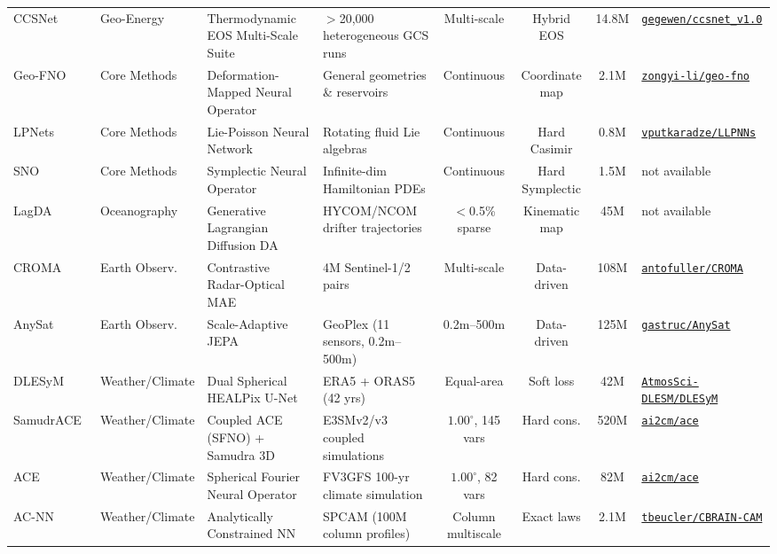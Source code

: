 \begin{table}[t]
{\begin{tabular}{@{}lp{2.0cm}p{3.0cm}p{3.4cm}cccp{3.0cm}@{}}
CCSNet~\cite{wen2021ccsnet} & Geo-Energy & Thermodynamic EOS Multi-Scale Suite & $>$20,000 heterogeneous GCS runs & Multi-scale & Hybrid EOS & 14.8M & \href{https://github.com/gegewen/ccsnet_v1.0}{\texttt{gegewen/ccsnet\_v1.0}} \\
Geo-FNO~\cite{li2022geofno} & Core Methods & Deformation-Mapped Neural Operator & General geometries \& reservoirs & Continuous & Coordinate map & 2.1M & \href{https://github.com/zongyi-li/geo-fno}{\texttt{zongyi-li/geo-fno}} \\
LPNets~\cite{eldred2023lpnets} & Core Methods & Lie-Poisson Neural Network & Rotating fluid Lie algebras & Continuous & Hard Casimir & 0.8M & \href{https://github.com/vputkaradze/LLPNNs}{\texttt{vputkaradze/LLPNNs}} \\
SNO~\cite{makara2026symplectic} & Core Methods & Symplectic Neural Operator & Infinite-dim Hamiltonian PDEs & Continuous & Hard Symplectic & 1.5M & not available \\
LagDA~\cite{asefi2025lagrangian} & Oceanography & Generative Lagrangian Diffusion DA & HYCOM/NCOM drifter trajectories & $<$0.5\% sparse & Kinematic map & 45M & not available \\
CROMA~\cite{fuller2023croma} & Earth Observ. & Contrastive Radar-Optical MAE & 4M Sentinel-1/2 pairs & Multi-scale & Data-driven & 108M & \href{https://github.com/antofuller/CROMA}{\texttt{antofuller/CROMA}} \\
AnySat~\cite{astruc2024anysat} & Earth Observ. & Scale-Adaptive JEPA & GeoPlex (11 sensors, 0.2m--500m) & 0.2m--500m & Data-driven & 125M & \href{https://github.com/gastruc/AnySat}{\texttt{gastruc/AnySat}} \\
DLESyM~\cite{cresswellclay2024dlesym} & Weather/Climate & Dual Spherical HEALPix U-Net & ERA5 + ORAS5 (42 yrs) & Equal-area & Soft loss & 42M & \href{https://github.com/AtmosSci-DLESM/DLESyM}{\texttt{AtmosSci-DLESM/DLESyM}} \\
SamudrACE~\cite{duncan2025samudrace} & Weather/Climate & Coupled ACE (SFNO) + Samudra 3D & E3SMv2/v3 coupled simulations & $1.00^\circ$, 145 vars & Hard cons. & 520M & \href{https://github.com/ai2cm/ace}{\texttt{ai2cm/ace}} \\
ACE~\cite{wattmeyer2024ace} & Weather/Climate & Spherical Fourier Neural Operator & FV3GFS 100-yr climate simulation & $1.00^\circ$, 82 vars & Hard cons. & 82M & \href{https://github.com/ai2cm/ace}{\texttt{ai2cm/ace}} \\
AC-NN~\cite{beucler2021enforcing} & Weather/Climate & Analytically Constrained NN & SPCAM (100M column profiles) & Column multiscale & Exact laws & 2.1M & \href{https://github.com/tbeucler/CBRAIN-CAM}{\texttt{tbeucler/CBRAIN-CAM}} \\

\end{tabular}}
\end{table}
